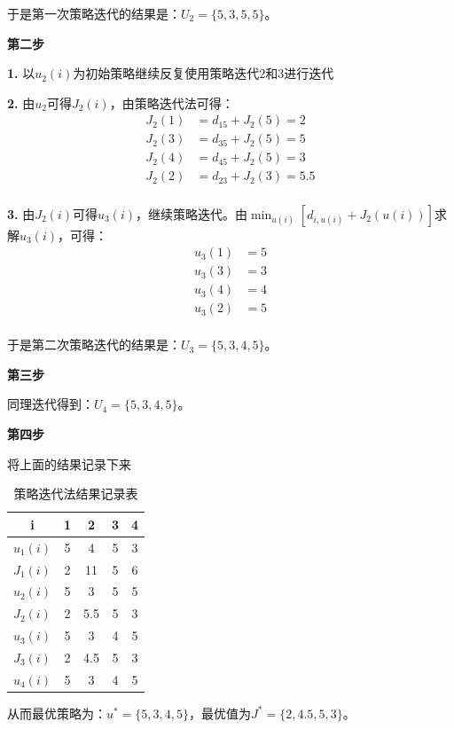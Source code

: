 \begin{example}
    于是第一次策略迭代的结果是：$U_2=\{5,3,5,5\}$。

    \textbf{第二步}

    \textbf{1.}
    以$u_2(i)$为初始策略继续反复使用策略迭代$2$和$3$进行迭代

    \textbf{2.}
    由$u_2$可得$J_2(i)$，由策略迭代法可得：
    \begin{equation}
        \begin{aligned}
            J_2(1) & = d_{15}+J_2(5) = 2   \\
            J_2(3) & = d_{35}+J_2(5) = 5   \\
            J_2(4) & = d_{45}+J_2(5) = 3   \\
            J_2(2) & = d_{23}+J_2(3) = 5.5 \\
        \end{aligned}
    \end{equation}

    \textbf{3.}
    由$J_2(i)$可得$u_3(i)$，继续策略迭代。由$\min_{u(i)}[d_{i,u(i)}+J_2(u(i))]$求解$u_3(i)$，可得：
    \begin{equation}
        \begin{aligned}
            u_3(1) & = 5 \\
            u_3(3) & = 3 \\
            u_3(4) & = 4 \\
            u_3(2) & = 5 \\
        \end{aligned}
    \end{equation}

    于是第二次策略迭代的结果是：$U_3=\{5,3,4,5\}$。

    \textbf{第三步}

    同理迭代得到：$U_4=\{5,3,4,5\}$。

    \textbf{第四步}

    将上面的结果记录下来

    \begin{table}[h]
        \centering
        \setlength{\tabcolsep}{5mm}
        \begin{tabular}{ccccc}
            \toprule
            i        & 1 & 2   & 3 & 4 \\
            \midrule
            $u_1(i)$ & 5 & 4   & 5 & 3 \\
            $J_1(i)$ & 2 & 11  & 5 & 6 \\
            $u_2(i)$ & 5 & 3   & 5 & 5 \\
            $J_2(i)$ & 2 & 5.5 & 5 & 3 \\
            $u_3(i)$ & 5 & 3   & 4 & 5 \\
            $J_3(i)$ & 2 & 4.5 & 5 & 3 \\
            $u_4(i)$ & 5 & 3   & 4 & 5 \\
            \bottomrule
        \end{tabular}
        \caption{策略迭代法结果记录表}
    \end{table}

    从而最优策略为：$u^*=\{5,3,4,5\}$，最优值为$J^*=\{2,4.5,5,3\}$。
\end{example}

